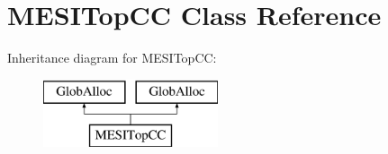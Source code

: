 \hypertarget{classMESITopCC}{\section{M\-E\-S\-I\-Top\-C\-C Class Reference}
\label{classMESITopCC}
}
Inheritance diagram for M\-E\-S\-I\-Top\-C\-C\-:\begin{figure}[H]
\begin{center}
\leavevmode
\includegraphics[height=2.000000cm]{classMESITopCC}
\end{center}
\end{figure}
